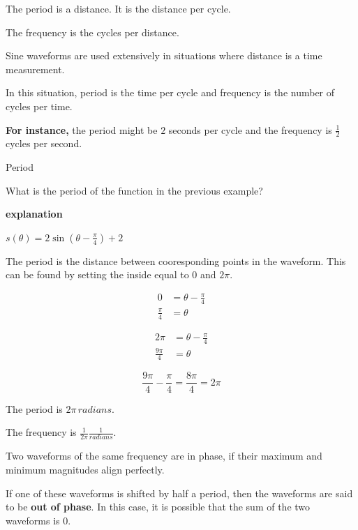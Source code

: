 \documentclass{ximera}
\begin{document}
The period is a distance.  It is the distance per cycle.

The frequency is the cycles per distance.

Sine waveforms are used extensively in situations where distance is a time measurement.

In this situation, period is the time per cycle and frequency is the number of cycles per time.

\textbf{For instance,} the period might be $2$ seconds per cycle and the frequency is $\frac{1}{2}$ cycles per second.












\begin{example}  Period

What is the period of the function in the previous example?


\textbf{\textcolor{red!75!green}{explanation}} 

$s(\theta) = 2 \sin\left(\theta - \frac{\pi}{4}\right) + 2$ 


The period is the distance between cooresponding points in the waveform.  This can be found by setting the inside equal to $0$ and $2\pi$.

\begin{align*}
 0 & = \theta - \frac{\pi}{4} \\
 \frac{\pi}{4} & = \theta 
 \end{align*}

\begin{align*}
 2 \pi & = \theta - \frac{\pi}{4} \\
 \frac{9\pi}{4} & = \theta 
 \end{align*}

\[
\frac{9\pi}{4} - \frac{\pi}{4} = \frac{8\pi}{4} = 2 \pi
\]



The period is $2\pi \, radians$. 

The frequency is $\frac{1}{2\pi} \tfrac{1}{radians}$. 

\end{example}






Two waveforms of the same frequency are in phase, if their maximum and minimum magnitudes align perfectly.

If one of these waveforms is shifted by half a period, then the waveforms are said to be \textbf{out of phase}. In this case, it is possible that the sum of the two waveforms is $0$.
\end{document}

